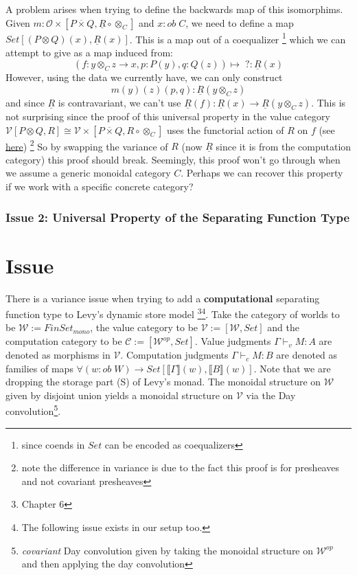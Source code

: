 \documentclass{article}
\newcommand{\den}[1]{\llbracket #1 \rrbracket}
\begin{document}
A problem arises when trying to define the backwards map of this isomorphims. 
Given $m : \mathcal{O\times}[P \overline{\times} Q , \underline{R} \circ \otimes_C]$ and $x : ob \; C$, we need to define a map
$Set[(P \otimes Q)(x), \underline{R}(x)]$. This is a map out of a coequalizer 
\footnote{since coends in $Set$ can be encoded as coequalizers}
which we can attempt to give as a map induced from:
\[
    (f : y\otimes_C z \rightarrow x , p : P(y) , q : Q(z)) \mapsto \;? : \underline{R}(x)
\]
However, using the data we currently have, we can only construct
\[
    m(y)(z)(p,q) : \underline{R} (y \otimes_C z)    
\]
and since $\underline{R}$ is contravariant, we can't use $\underline{R}(f) : \underline{R}(x) \rightarrow \underline{R}(y \otimes_C z)$.
This is not surprising since the proof of this universal property in the value category 
$\mathcal{V}[P \otimes Q , R] \cong \mathcal{V\times}[P \overline{\times} Q , R \circ \otimes_C]$
uses the functorial action of $R$ on $f$ 
(see \href{https://github.com/bond15/Bunched-CBPV/blob/d4de5ebe3a2a42499b24c13a8d2da7f3a2cc1b36/src/Data/BiDCC.agda#L120}{here})
\footnote{note the difference in variance is due to the fact this proof is for presheaves and not covariant presheaves}
So by swapping the variance of $R$ (now $\underline{R}$ since it is from the computation category) this proof should break.
Seemingly, this proof won't go through when we assume a generic monoidal category $C$. Perhaps we can recover this property if 
we work with a specific concrete category?

\subsubsection{Issue 2: Universal Property of the Separating Function Type}



\section{Issue}
There is a variance issue when trying to add a \textbf{computational} separating 
function type to Levy's dynamic store model\cite{CBPVbook}
\footnote{Chapter 6}\footnote{The following issue exists in our setup too.}. Take the category 
of worlds to be $\mathcal{W} := FinSet_{mono}$, the value category to be $\mathcal{V} :=  [\mathcal{W}, Set]$ 
and the computation category to be $\mathcal{C} := [\mathcal{W}^{op} , Set]$. 
Value judgments $\Gamma \vdash_v M : A$ are denoted as morphisms in $\mathcal{V}$.
Computation judgments $\Gamma \vdash_c M : B$ are denoted as families of maps $\forall(w : ob \;W) 
\rightarrow Set[ \den{\Gamma}(w) , \den{B}(w)]$. Note that we are dropping the storage
part (S) of Levy's monad. The monoidal structure on $\mathcal{W}$ given by disjoint union yields a monoidal
structure on $\mathcal{V}$ via the Day convolution\footnote{\textit{covariant}
Day convolution given by taking the monoidal structure on $\mathcal{W}^{op}$ and
then applying the day convolution}. 
\end{document}
